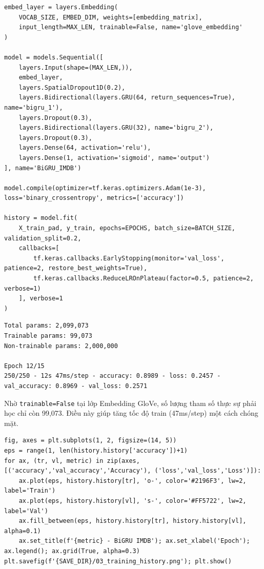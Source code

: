 \begin{lstlisting}[style=pythoncode, caption={Xây dựng BiGRU 2 tầng với SpatialDropout1D}]
embed_layer = layers.Embedding(
    VOCAB_SIZE, EMBED_DIM, weights=[embedding_matrix],
    input_length=MAX_LEN, trainable=False, name='glove_embedding'
)

model = models.Sequential([
    layers.Input(shape=(MAX_LEN,)),
    embed_layer,
    layers.SpatialDropout1D(0.2),
    layers.Bidirectional(layers.GRU(64, return_sequences=True), name='bigru_1'),
    layers.Dropout(0.3),
    layers.Bidirectional(layers.GRU(32), name='bigru_2'),
    layers.Dropout(0.3),
    layers.Dense(64, activation='relu'),
    layers.Dense(1, activation='sigmoid', name='output')
], name='BiGRU_IMDB')

model.compile(optimizer=tf.keras.optimizers.Adam(1e-3), loss='binary_crossentropy', metrics=['accuracy'])

history = model.fit(
    X_train_pad, y_train, epochs=EPOCHS, batch_size=BATCH_SIZE, validation_split=0.2,
    callbacks=[
        tf.keras.callbacks.EarlyStopping(monitor='val_loss', patience=2, restore_best_weights=True),
        tf.keras.callbacks.ReduceLROnPlateau(factor=0.5, patience=2, verbose=1)
    ], verbose=1
)
\end{lstlisting}

\begin{lstlisting}[style=consoleoutput, caption={Output: Thời gian hội tụ nhanh chóng nhờ GloVe}]
Total params: 2,099,073
Trainable params: 99,073
Non-trainable params: 2,000,000

Epoch 12/15
250/250 - 12s 47ms/step - accuracy: 0.8989 - loss: 0.2457 - val_accuracy: 0.8969 - val_loss: 0.2571 
\end{lstlisting}
Nhờ \texttt{trainable=False} tại lớp Embedding GloVe, số lượng tham số thực sự phải học chỉ còn 99,073. Điều này giúp tăng tốc độ train (47ms/step) một cách chóng mặt.

\begin{lstlisting}[style=pythoncode, caption={Biểu diễn Learning Curve}]
fig, axes = plt.subplots(1, 2, figsize=(14, 5))
eps = range(1, len(history.history['accuracy'])+1)
for ax, (tr, vl, metric) in zip(axes, [('accuracy','val_accuracy','Accuracy'), ('loss','val_loss','Loss')]):
    ax.plot(eps, history.history[tr], 'o-', color='#2196F3', lw=2, label='Train')
    ax.plot(eps, history.history[vl], 's-', color='#FF5722', lw=2, label='Val')
    ax.fill_between(eps, history.history[tr], history.history[vl], alpha=0.1)
    ax.set_title(f'{metric} - BiGRU IMDB'); ax.set_xlabel('Epoch'); ax.legend(); ax.grid(True, alpha=0.3)
plt.savefig(f'{SAVE_DIR}/03_training_history.png'); plt.show()
\end{lstlisting}


